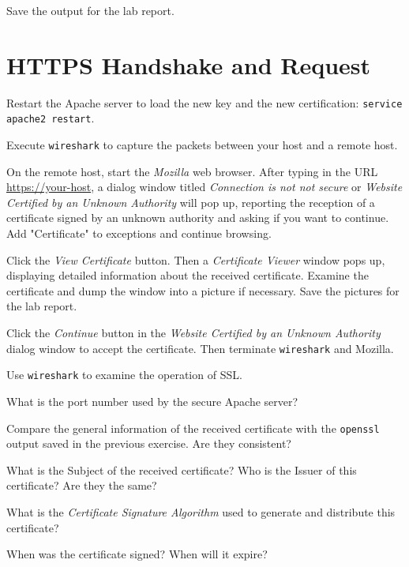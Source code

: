 \documentclass{../UTNetLab}
\begin{document}
    Save the output for the lab report.

\section{HTTPS Handshake and Request}
    Restart the Apache server to load the new key and the new certification: \lstinline{service apache2 restart}.

    Execute \lstinline{wireshark} to capture the packets between your host and a remote host.

    On the remote host, start the \textit{Mozilla} web browser. After typing in the URL \url{https://your-host}, a dialog window titled \textit{Connection is not not secure} or \textit{Website Certified by an Unknown Authority} will pop up, reporting the reception of a certificate signed by an unknown authority and asking if you want to continue. Add "Certificate" to exceptions and continue browsing.

    Click the \textit{View Certificate} button. Then a \textit{Certificate Viewer} window pops up, displaying detailed information about the received certificate. Examine the certificate and dump the window into a picture if necessary. Save the pictures for the lab report.

    Click the \textit{Continue} button in the \textit{Website Certified by an Unknown Authority} dialog window to accept the certificate. Then terminate \lstinline{wireshark} and Mozilla.

    Use \lstinline{wireshark} to examine the operation of SSL.

    \begin{report}
    \item What is the port number used by the secure Apache server?
    
    \item Compare the general information of the received certificate with the \lstinline{openssl} output saved in the previous exercise. Are they consistent?
    
    \item What is the Subject of the received certificate? Who is the Issuer of this certificate? Are they the same?
    
    \item What is the \textit{Certificate Signature Algorithm} used to generate and distribute this certificate?
    
    \item When was the certificate signed? When will it expire?
    \end{report}
\end{document}
